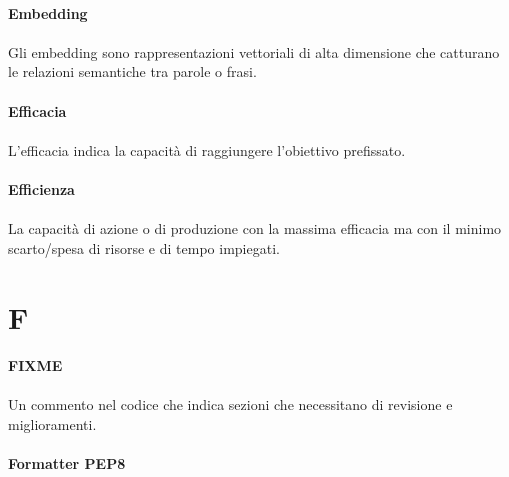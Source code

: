 \documentclass[10pt, a4paper]{article}
\begin{document}
\paragraph{Embedding}\noindent\hrulefill
\paragraph{}Gli embedding sono rappresentazioni vettoriali di alta dimensione che catturano le relazioni semantiche tra parole o frasi.

\vspace{2em}
\paragraph{Efficacia}\noindent\hrulefill
\paragraph{}L'efficacia indica la capacità di raggiungere l'obiettivo prefissato.

\vspace{2em}
\paragraph{Efficienza}\noindent\hrulefill
\paragraph{}La capacità di azione o di produzione con la massima efficacia ma con il minimo scarto/spesa di risorse e di tempo impiegati.

\newpage
\section{F}
\vspace{2em}
\paragraph{FIXME}\noindent\hrulefill
\paragraph{}Un commento nel codice che indica sezioni che necessitano di revisione e miglioramenti.


\vspace{2em}
\paragraph{Formatter PEP8}\noindent\hrulefill
\end{document}
